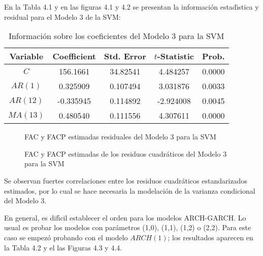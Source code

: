 En la Tabla 4.1 y en las figuras 4.1 y 4.2 se presentan la informaci\'{o}n 
estad\'{\i}stica y residual para el Modelo 3 de la SVM:

\begin{table}[H]
\centering\small
\caption{Informaci\'{o}n sobre los coeficientes del Modelo 3 para la SVM}
\begin{tabular}{@{}ccccc@{}}
\toprule
Variable& Coefficient& Std. Error& $t$-Statistic& Prob. \\
\midrule
$C$& 156.1661& 34.82541& 4.484257& 0.0000 \\
$AR(1)$& 0.325909& 0.107494& 3.031876& 0.0033 \\
$AR(12)$& -0.335945& 0.114892& -2.924008& 0.0045 \\
$MA(13)$& 0.480540& 0.111556& 4.307611& 0.0000 \\
\bottomrule
\end{tabular}
\end{table}

\begin{figure}[H]
\centering
\caption{FAC y FACP estimadas residuales del Modelo 3 para la SVM}
\end{figure}

\begin{figure}[H]
\centering
\caption{FAC y FACP estimadas de los residuos cuadr\'{a}ticos del Modelo 
3 para la SVM}
\end{figure}


Se observan fuertes correlaciones entre los residuos cuadr\'{a}ticos 
estandarizados estimados, por lo cual se hace necesaria la modelaci\'{o}n de 
la varianza condicional del Modelo 3.

En general, es dif\'{\i}cil establecer el orden para los modelos ARCH-GARCH. 
Lo usual es probar los modelos con par\'{a}metros (1,0), (1,1), (1,2) o 
(2,2). Para este caso se empez\'{o} probando con el modelo $ARCH(1)$; los 
resultados aparecen en la Tabla 4.2 y el las Figuras 4.3 y 4.4. 


